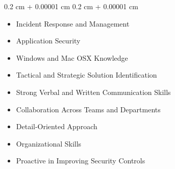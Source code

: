 \documentclass[10pt, letterpaper]{article}
\newenvironment{highlightsforbulletentries}{
    \begin{itemize}[
        topsep=0.10 cm,
        parsep=0.10 cm,
        partopsep=0pt,
        itemsep=0pt,
        leftmargin=10pt
    ]
}{
    \end{itemize}
} %
\newenvironment{onecolentry}{
    \begin{adjustwidth}{
        0.2 cm + 0.00001 cm
    }{
        0.2 cm + 0.00001 cm
    }
}{
    \end{adjustwidth}
} %
\begin{document}
    \begin{onecolentry}
        \begin{highlightsforbulletentries}


        \item Incident Response and Management

        \item Application Security

        \item Windows and Mac OSX Knowledge

        \item Tactical and Strategic Solution Identification

        \item Strong Verbal and Written Communication Skills

        \item Collaboration Across Teams and Departments

        \item Detail-Oriented Approach

        \item Organizational Skills

        \item Proactive in Improving Security Controls


        \end{highlightsforbulletentries}
    \end{onecolentry}
\end{document}
